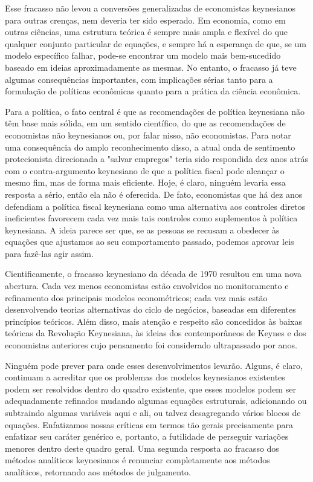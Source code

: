 \documentclass[12pt]{article}
\begin{document}
Esse fracasso não levou a conversões generalizadas de economistas keynesianos para outras crenças, nem deveria ter sido esperado. Em economia, como em outras ciências, uma estrutura teórica é sempre mais ampla e flexível do que qualquer conjunto particular de equações, e sempre há a esperança de que, se um modelo específico falhar, pode-se encontrar um modelo mais bem-sucedido baseado em ideias aproximadamente as mesmas. No entanto, o fracasso já teve algumas consequências importantes, com implicações sérias tanto para a formulação de políticas econômicas quanto para a prática da ciência econômica.

Para a política, o fato central é que as recomendações de política keynesiana não têm base mais sólida, em um sentido científico, do que as recomendações de economistas não keynesianos ou, por falar nisso, não economistas. Para notar uma consequência do amplo reconhecimento disso, a atual onda de sentimento protecionista direcionada a "salvar empregos" teria sido respondida dez anos atrás com o contra-argumento keynesiano de que a política fiscal pode alcançar o mesmo fim, mas de forma mais eficiente. Hoje, é claro, ninguém levaria essa resposta a sério, então ela não é oferecida. De fato, economistas que há dez anos defendiam a política fiscal keynesiana como uma alternativa aos controles diretos ineficientes favorecem cada vez mais tais controles como suplementos à política keynesiana. A ideia parece ser que, se as pessoas se recusam a obedecer às equações que ajustamos ao seu comportamento passado, podemos aprovar leis para fazê-las agir assim.

Cientificamente, o fracasso keynesiano da década de 1970 resultou em uma nova abertura. Cada vez menos economistas estão envolvidos no monitoramento e refinamento dos principais modelos econométricos; cada vez mais estão desenvolvendo teorias alternativas do ciclo de negócios, baseadas em diferentes princípios teóricos. Além disso, mais atenção e respeito são concedidos às baixas teóricas da Revolução Keynesiana, às ideias dos contemporâneos de Keynes e dos economistas anteriores cujo pensamento foi considerado ultrapassado por anos.

Ninguém pode prever para onde esses desenvolvimentos levarão. Alguns, é claro, continuam a acreditar que os problemas dos modelos keynesianos existentes podem ser resolvidos dentro do quadro existente, que esses modelos podem ser adequadamente refinados mudando algumas equações estruturais, adicionando ou subtraindo algumas variáveis aqui e ali, ou talvez desagregando vários blocos de equações. Enfatizamos nossas críticas em termos tão gerais precisamente para enfatizar seu caráter genérico e, portanto, a futilidade de perseguir variações menores dentro deste quadro geral. Uma segunda resposta ao fracasso dos métodos analíticos keynesianos é renunciar completamente aos métodos analíticos, retornando aos métodos de julgamento.
\end{document}
